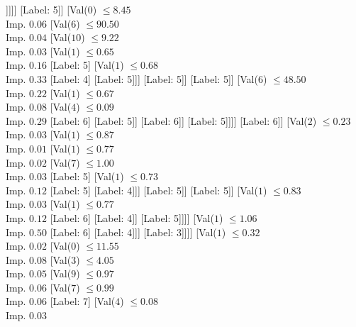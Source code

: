 \documentclass[margin=10pt]{standalone}
\begin{document}
\begin{forest}
														[Label: 5]
														[Val($5$) $ \leq 7.50$ \\ Imp. $0.12$
															[Label: 5]
															[Label: 6]]]]]
											[Label: 5]]
										[Val($0$) $ \leq 8.45$ \\ Imp. $0.06$
											[Val($6$) $ \leq 90.50$ \\ Imp. $0.04$
												[Val($10$) $ \leq 9.22$ \\ Imp. $0.03$
													[Val($1$) $ \leq 0.65$ \\ Imp. $0.16$
														[Label: 5]
														[Val($1$) $ \leq 0.68$ \\ Imp. $0.33$
															[Label: 4]
															[Label: 5]]]
													[Label: 5]]
												[Label: 5]]
											[Val($6$) $ \leq 48.50$ \\ Imp. $0.22$
												[Val($1$) $ \leq 0.67$ \\ Imp. $0.08$
													[Val($4$) $ \leq 0.09$ \\ Imp. $0.29$
														[Label: 6]
														[Label: 5]]
													[Label: 6]]
												[Label: 5]]]]
									[Label: 6]]
								[Val($2$) $ \leq 0.23$ \\ Imp. $0.03$
									[Val($1$) $ \leq 0.87$ \\ Imp. $0.01$
										[Val($1$) $ \leq 0.77$ \\ Imp. $0.02$
											[Val($7$) $ \leq 1.00$ \\ Imp. $0.03$
												[Label: 5]
												[Val($1$) $ \leq 0.73$ \\ Imp. $0.12$
													[Label: 5]
													[Label: 4]]]
											[Label: 5]]
										[Label: 5]]
									[Val($1$) $ \leq 0.83$ \\ Imp. $0.03$
										[Val($1$) $ \leq 0.77$ \\ Imp. $0.12$
											[Label: 6]
											[Label: 4]]
										[Label: 5]]]]
							[Val($1$) $ \leq 1.06$ \\ Imp. $0.50$
								[Label: 6]
								[Label: 4]]]
						[Label: 3]]]]
			[Val($1$) $ \leq 0.32$ \\ Imp. $0.02$
				[Val($0$) $ \leq 11.55$ \\ Imp. $0.08$
					[Val($3$) $ \leq 4.05$ \\ Imp. $0.05$
						[Val($9$) $ \leq 0.97$ \\ Imp. $0.06$
							[Val($7$) $ \leq 0.99$ \\ Imp. $0.06$
								[Label: 7]
								[Val($4$) $ \leq 0.08$ \\ Imp. $0.03$

\end{forest}
\end{document}
